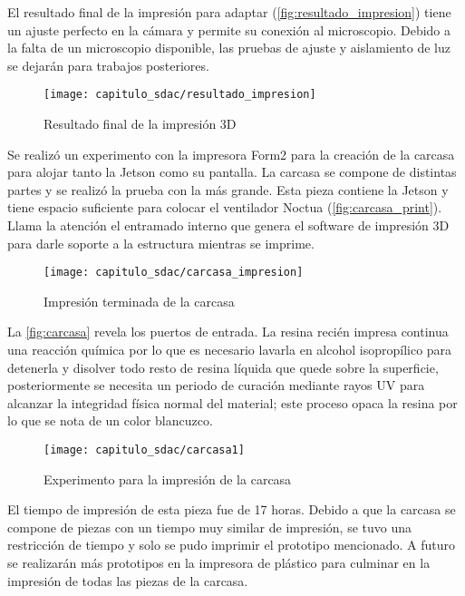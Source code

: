 El resultado final de la impresión para adaptar
(\autoref{fig:resultado_impresion}) tiene un ajuste perfecto en la cámara y
permite su conexión al microscopio. Debido a la falta de  un microscopio
disponible, las pruebas de ajuste y aislamiento de luz se dejarán para trabajos
posteriores.

\begin{figure}[H]
    \centering
    \texttt{[image: capitulo\_sdac/resultado\_impresion]}
    \caption{Resultado final de la impresión 3D}\label{fig:resultado_impresion}
\end{figure}

Se realizó un experimento con la impresora Form2 para la creación de la carcasa
para alojar tanto la Jetson como su pantalla. La carcasa se compone de distintas
partes y se realizó la prueba con la más grande. Esta pieza contiene la Jetson y
tiene espacio suficiente para colocar el ventilador Noctua
(\autoref{fig:carcasa_print}). Llama la atención el entramado interno que genera
el software de impresión 3D para darle soporte a la estructura mientras se
imprime.

\begin{figure}[H]
    \centering
    \texttt{[image: capitulo\_sdac/carcasa\_impresion]}
    \caption{Impresión terminada de la carcasa}\label{fig:carcasa_print}
\end{figure}

La \autoref{fig:carcasa} revela los puertos de entrada. La resina recién impresa
continua una reacción química por lo que es necesario lavarla en alcohol
isopropílico para detenerla y disolver todo resto de resina líquida que quede
sobre la superficie, posteriormente se necesita un periodo de curación mediante
rayos UV para alcanzar la integridad física normal del material; este proceso
opaca la resina por lo que se nota de un color blancuzco.

\begin{figure}[H]
    \centering
    \texttt{[image: capitulo\_sdac/carcasa1]}
    \caption{Experimento para la impresión de la carcasa}\label{fig:carcasa}
\end{figure}

El tiempo de impresión de esta pieza fue de 17 horas. Debido a que la carcasa se
compone de piezas con un tiempo muy similar de impresión, se tuvo una
restricción de tiempo y solo se pudo imprimir el prototipo mencionado. A futuro
se realizarán más prototipos en la impresora de plástico para culminar en la
impresión de todas las piezas de la carcasa.

